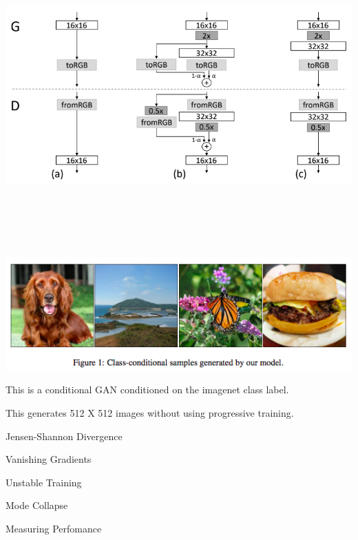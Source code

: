 {
\centerline{\includegraphics[height = 4.5in]{../images/GANprogc}}

\centerline{\includegraphics[width = 9in]{../images/GANclass}}

\vfill
This is a conditional GAN conditioned on the imagenet class label.

\vfill
This generates 512 X 512 images without using progressive training.


\centerline{Jensen-Shannon Divergence}

\vfill
\centerline{Vanishing Gradients}

\vfill
\centerline{Unstable Training}

\vfill
\centerline{Mode Collapse}

\vfill
\centerline{Measuring Perfomance}




}
